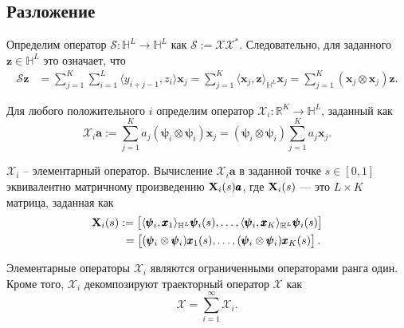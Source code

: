 \documentclass[12pt, specialist, subf
]{disser}
\theoremstyle{definition}
\begin{document}
\subsection*{Разложение}
Определим оператор $\mathcal{S}: \mathbb{H}^L\rightarrow \mathbb{H}^L$ как $\mathcal{S}:=\mathcal{X}\mathcal{X}^*$. Следовательно, для заданного ${\pmb z}\in \mathbb{H}^{L}$ это означает, что
\begin{align}\label{eq: s-operator}
	\mathcal{S}{\pmb z} &
	=\sum_{j=1}^K\sum_{i=1}^L \langle y_{i+j-1} , z_i \rangle {\pmb x}_j
	=\sum_{j=1}^K \langle {\pmb x}_j , {\pmb z} \rangle_{\mathbb{H}^L} {\pmb x}_j
	=\sum_{j=1}^K ({\pmb x}_j \otimes {\pmb x}_j) {\pmb z}.
\end{align}



Для любого положительного $i$ определим оператор $\mathcal{X}_i:\mathbb{R}^K\rightarrow\mathbb{H}^L$, заданный как
\begin{equation}\label{eq: elementary oprator}
	\mathcal{X}_i \pmb{a}:=\sum_{j=1}^K a_j (\pmb{\psi}_i\otimes \pmb{\psi}_i){\pmb x}_j= (\pmb{\psi}_i\otimes \pmb{\psi}_i)\sum_{j=1}^K a_j{\pmb x}_j.
\end{equation}

$\mathcal{X}_i$ -- элементарный оператор. Вычисление $\mathcal{X}_i \pmb{a}$ в заданной точке $s\in [0,1]$ эквивалентно матричному произведению ${\bf X}_i(s)\pmb{a}$, где ${\bf X}_i(s)$ — это $L \times K$ матрица, заданная как
\begin{align}\label{eq:elementary mat}
	{\bf X}_i(s) & :=
	\begin{bmatrix} \langle\pmb{\psi}_i, {\pmb x}_1\rangle_{\mathbb{H}^L} \pmb{\psi}_i(s), \ldots, \langle\pmb{\psi}_i, {\pmb x}_K\rangle_{\mathbb{H}^L} \pmb{\psi}_i(s) \end{bmatrix}
	\notag            \\ &\ =
	\begin{bmatrix} (\pmb{\psi}_i\otimes \pmb{\psi}_i){\pmb x}_1(s), \ldots, (\pmb{\psi}_i\otimes \pmb{\psi}_i){\pmb x}_K(s) \end{bmatrix}.
\end{align}



Элементарные операторы $\mathcal{X}_i$ являются ограниченными операторами ранга один. Кроме того, $\mathcal{X}_i$ декомпозируют траекторный оператор $\mathcal{X}$ как
\begin{equation}\label{eq:elementary operators}
	\mathcal{X}=\sum_{i=1}^\infty \mathcal{X}_i.
\end{equation}
\end{document}
